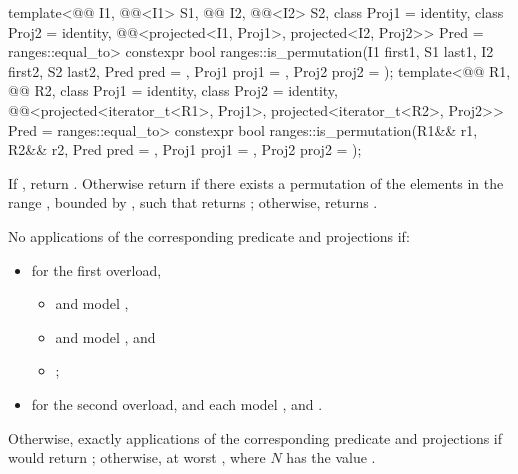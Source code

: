 %
\begin{itemdecl}
template<@@ I1, @@<I1> S1, @@ I2,
         @@<I2> S2, class Proj1 = identity, class Proj2 = identity,
         @@<projected<I1, Proj1>,
                                       projected<I2, Proj2>> Pred = ranges::equal_to>
  constexpr bool ranges::is_permutation(I1 first1, S1 last1, I2 first2, S2 last2,
                                        Pred pred = {},
                                        Proj1 proj1 = {}, Proj2 proj2 = {});
template<@@ R1, @@ R2,
         class Proj1 = identity, class Proj2 = identity,
         @@<projected<iterator_t<R1>, Proj1>,
                                       projected<iterator_t<R2>, Proj2>> Pred = ranges::equal_to>
  constexpr bool ranges::is_permutation(R1&& r1, R2&& r2, Pred pred = {},
                                        Proj1 proj1 = {}, Proj2 proj2 = {});
\end{itemdecl}

\begin{itemdescr}
\pnum
\returns
If , return .
Otherwise return  if there exists a permutation of the elements
in the range , bounded by ,
such that
returns ;
otherwise, returns .

\pnum
\complexity
No applications of the corresponding predicate and projections if:
\begin{itemize}
\item
for the first overload,
\begin{itemize}
\item {} and  model ,
\item {} and  model , and
\item {};
\end{itemize}
\item
for the second overload,
 and  each model , and
.
\end{itemize}
Otherwise, exactly  applications
of the corresponding predicate and projections
if 
would return ;
otherwise, at worst , where $N$ has the value .
\end{itemdescr}

